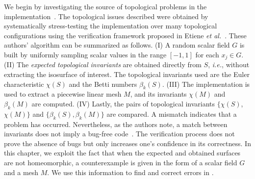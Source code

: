 We begin by investigating the source of topological problems in the \mc{} implementation~\cite{Etiene:2012:TVI:2197070.2197097}.
%
%
The topological issues described were obtained by systematically stress-testing the \mc{} implementation over many topological configurations using the verification framework proposed in Etiene \emph{et al.}~\cite{Etiene:2012:TVI:2197070.2197097}. These authors' algorithm can be summarized as follows.
%
(I) A random scalar field $G$ is built by uniformly sampling scalar values in the range $[-1,1]$ for each $x_j \in G$.
%
(II) The \emph{expected topological invariants} are obtained directly from $S$, {\em i.e.}, without extracting the isosurface of interest. The topological invariants used are the Euler characteristic $\chi(S)$ and the Betti numbers $\beta_k(S)$. 
%
(III) The \mc{} implementation is used to extract a piecewise linear mesh $M$, and its invariants $\chi(M)$ and $\beta_k(M)$ are computed.
%
(IV) Lastly, the pairs of topological invariants $\{\chi(S)$, $\chi(M)\}$ and $\{\beta_k(S), \beta_k(M)\}$ are compared. A mismatch indicates that a problem has occurred. Nevertheless,  as the authors note, a match between invariants does not imply a bug-free code~\cite{Etiene:2012:TVI:2197070.2197097}. The verification process does not prove the absence of bugs but only increases one's confidence in its correctness.
%
In this chapter, we exploit the fact that when the expected and obtained surfaces are not homeomorphic, a counterexample is given in the form of a scalar field $G$ and a mesh $M$. We use this information to find and correct errors in \mc{}.


